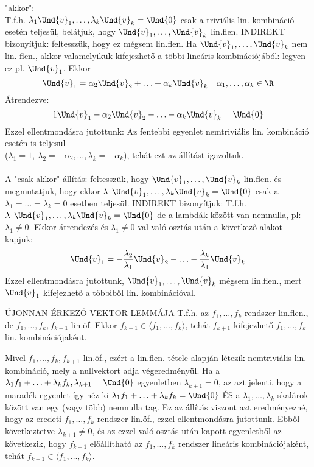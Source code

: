 \begin{bizonyitas}{}
"akkor":\\
T.f.h. $\lambda_1\Und{v}_1,\ldots,\lambda_k\Und{v}_k = \Und{0}$ csak a triviális lin. kombináció esetén teljesül, belátjuk, hogy $\Und{v}_1,\ldots,\Und{v}_k$ lin.flen. INDIREKT bizonyítjuk: feltesszük, hogy ez mégsem lin.flen. Ha $\Und{v}_1,\ldots,\Und{v}_k$ nem lin. flen., akkor valamelyikük kifejezhető a többi lineáris kombinációjából: legyen ez pl. $\Und{v}_1$. Ekkor $$\Und{v}_1 = \alpha_2\Und{v}_2 + \ldots + \alpha_k\Und{v}_k\quad \alpha_1,\ldots,\alpha_k \in \R$$
Átrendezve: $$1\Und{v}_1-\alpha_2\Und{v}_2 - \ldots - \alpha_k\Und{v}_k = \Und{0}$$
Ezzel ellentmondásra jutottunk: Az fentebbi egyenlet nemtriviális lin. kombináció esetén is teljesül \\($\lambda_1 = 1,\: \lambda_2 = -\alpha_2,\ldots, \lambda_k = -\alpha_k$), tehát ezt az állítást igazoltuk.\\\\
A "csak akkor" állítás: feltesszük, hogy  $\Und{v}_1,\ldots,\Und{v}_k$ lin.flen. és megmutatjuk, hogy ekkor  $\lambda_1\Und{v}_1,\ldots,\lambda_k\Und{v}_k = \Und{0}$ csak a $\lambda_1 = \ldots = \lambda_k = 0$ esetben teljesül. INDIREKT bizonyítjuk: T.f.h. $\lambda_1\Und{v}_1,\ldots,\lambda_k\Und{v}_k = \Und{0}$ de a lambdák között van nemnulla, pl: $\lambda_1 \neq 0$. Ekkor átrendezés és $\lambda_1 \neq 0$-val való osztás után a következő alakot kapjuk:
$$\Und{v}_1 = -\frac{\lambda_2}{\lambda_1}\Und{v}_2-\ldots-\frac{\lambda_k}{\lambda_1}\Und{v}_k$$
Ezzel ellentmondásra jutottunk, $\Und{v}_1,\ldots,\Und{v}_k$ mégsem lin.flen., mert $\Und{v}_1$ kifejezhető a többiből lin. kombinációval.
\end{bizonyitas}

\begin{tetel}{ÚJONNAN ÉRKEZŐ VEKTOR LEMMÁJA}
T.f.h. az $f_1,\ldots,f_k$ rendszer lin.flen., de $f_1,\ldots,f_k,f_{k+1}$ lin.öf. Ekkor $f_{k+1} \in \langle f_1,\ldots,f_k \rangle$, tehát $f_{k+1}$ kifejezhető $f_1,\ldots,f_k$ lin. kombinációjaként.
\end{tetel}

\begin{bizonyitas}{}
Mivel $f_1,\ldots,f_k,f_{k+1}$ lin.öf., ezért a lin.flen. tétele alapján létezik nemtriviális lin. kombináció, mely a nullvektort adja végeredményül. Ha a
$\lambda_1f_1+\ldots+\lambda_kf_k,\lambda_{k+1} = \Und{0}$  egyenletben $\lambda_{k+1} = 0$, az azt jelenti, hogy a maradék egyenlet így néz ki $\lambda_1f_1+\ldots+\lambda_kf_k = \Und{0}$ ÉS a $\lambda_1,\ldots,\lambda_k$ skalárok között van egy (vagy több) nemnulla tag. Ez az állítás viszont azt eredményezné, hogy az eredeti $f_1,\ldots,f_k$ rendszer lin.öf., ezzel ellentmondásra jutottunk. Ebből következtetve $\lambda_{k+1} \neq 0$, és az ezzel való osztás után kapott egyenletből az következik, hogy $f_{k+1}$ előállítható az $f_1,\ldots,f_k$ rendszer lineáris kombinációjaként, tehát $f_{k+1} \in \langle f_1,\ldots,f_k \rangle$.
\end{bizonyitas}

